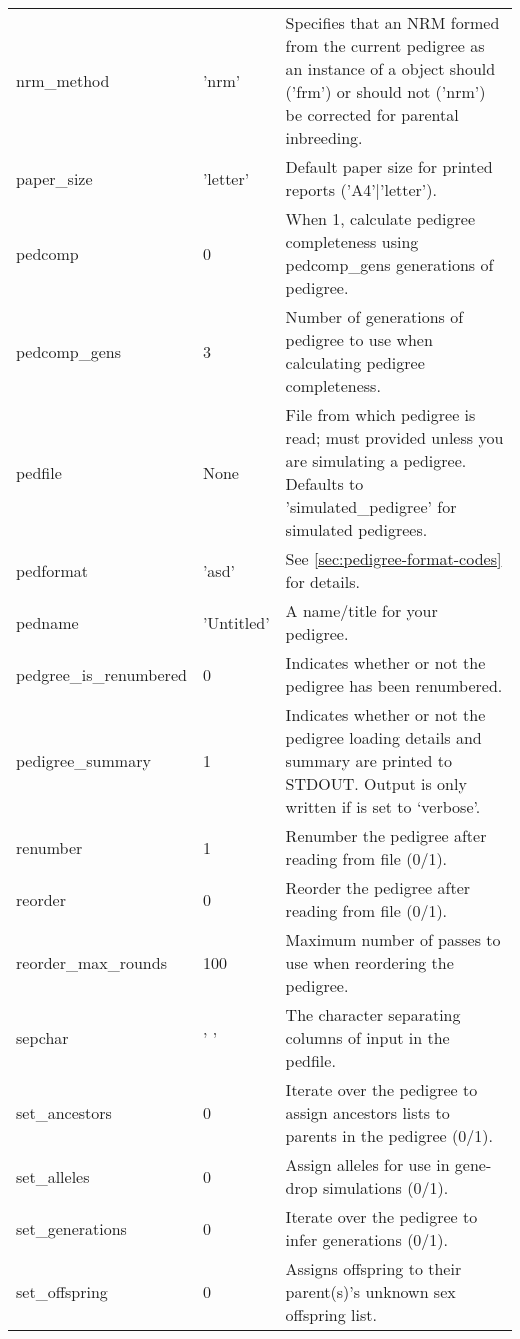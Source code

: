 \begin{center}
\begin{xtabular}{l|l|p{4in}}
	nrm\_method      & 'nrm'        & Specifies that an NRM formed from the current pedigree as an instance of a  object should ('frm') or should not ('nrm') be corrected for parental inbreeding. \\
	paper\_size       & 'letter'     & Default paper size for printed reports ('A4'|'letter'). \\
	pedcomp          & 0            & When 1, calculate pedigree completeness using pedcomp\_gens generations of pedigree. \\
	pedcomp\_gens    & 3            & Number of generations of pedigree to use when calculating pedigree completeness. \\
	pedfile          & None         & File from which pedigree is read; must provided unless you are simulating a pedigree. Defaults to 'simulated_pedigree' for simulated pedigrees. \\
	pedformat        & 'asd'        & See \ref{sec:pedigree-format-codes} for details. \\
	pedname          & 'Untitled'   & A name/title for your pedigree. \\
	pedgree\_is\_renumbered & 0     & Indicates whether or not the pedigree has been renumbered. \\
	pedigree\_summary & 1           & Indicates whether or not the pedigree loading details and summary are printed to STDOUT.  Output is only written if  is set to `verbose'. \\
	renumber         & 1            & Renumber the pedigree after reading from file (0/1). \\
	reorder 	 & 0		& Reorder the pedigree after reading from file (0/1). \\
	reorder\_max\_rounds & 100	& Maximum number of passes to use when reordering the pedigree. \\
	sepchar          & ' '          & The character separating columns of input in the pedfile. \\
	set\_ancestors   & 0            & Iterate over the pedigree to assign ancestors lists to parents in the pedigree (0/1). \\
	set\_alleles     & 0            & Assign alleles for use in gene-drop simulations (0/1). \\
	set\_generations & 0            & Iterate over the pedigree to infer generations (0/1). \\
	set\_offspring   & 0            & Assigns offspring to their parent(s)'s unknown sex offspring list. \\

\end{xtabular}
\end{center}
